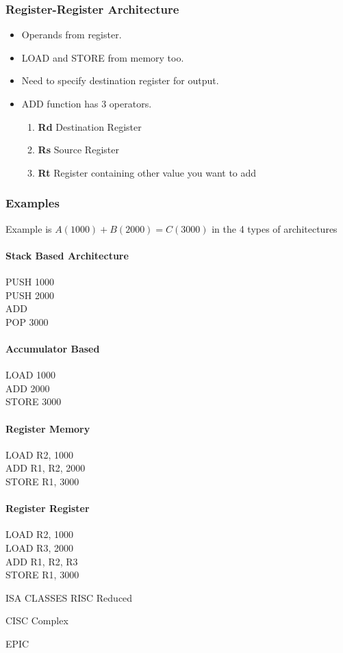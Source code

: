 \documentclass{article}
\newcommand\tab[1][0.5cm]{\hspace*{#1}}
\begin{document}
		\subsubsection{Register-Register Architecture}
			\begin{itemize}
				\item Operands from register.
				\item LOAD and STORE from memory too.
				\item Need to specify destination register for output.
				\item ADD function has 3 operators.
					\begin{enumerate}
						\item \textbf{Rd} Destination Register
						\item \textbf{Rs} Source Register 
						\item \textbf{Rt} Register containing other value you want to add
					\end{enumerate}
			\end{itemize}

		\subsubsection{Examples}
		Example is $A(1000) + B(2000) = C(3000)$ in the 4 types of architectures
		
		\paragraph{Stack Based Architecture\\}
				PUSH 1000 \\ \tab
				PUSH 2000 \\ \tab
				ADD \\ \tab
				POP 3000

		\paragraph{Accumulator Based\\}
				LOAD 1000 \\ \tab
				ADD 2000 \\ \tab
				STORE 3000

		\paragraph{Register Memory\\}
				LOAD R2, 1000 \\ \tab
				ADD R1, R2, 2000 \\ \tab
				STORE R1, 3000

		\paragraph{Register Register\\}
				LOAD R2, 1000 \\ \tab
				LOAD R3, 2000 \\ \tab
				ADD R1, R2, R3 \\ \tab
				STORE R1, 3000


		ISA CLASSES
			RISC
				Reduced

			CISC
				Complex

			EPIC


		
\end{document}
